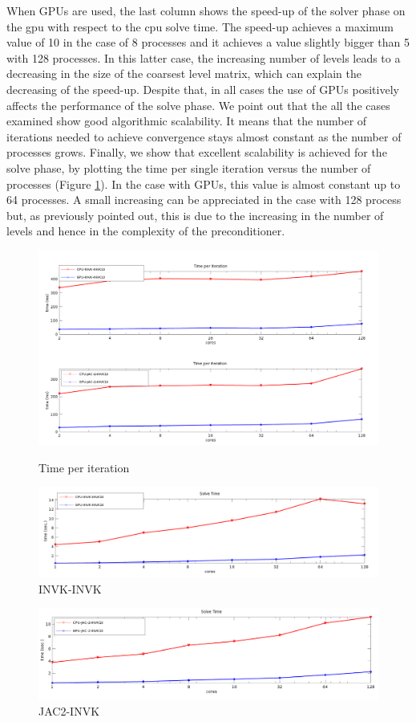 When GPUs are used, the last column shows the speed-up of the solver phase on the gpu with respect to the cpu solve time. The speed-up achieves a maximum value of 10 in the case of 8 processes and it achieves a value slightly bigger than 5 with 128 processes. In this latter case, the increasing number of levels leads to a decreasing in the size of the coarsest level matrix, which can explain the decreasing of the speed-up. Despite that, in all cases the use of GPUs positively affects the performance of the solve phase. 
We point out that the all the cases examined show good algorithmic scalability. It means that the number of iterations needed to achieve convergence stays almost constant as the number of processes grows. 
Finally, we show that excellent scalability is achieved for the solve phase, by plotting the time per single iteration versus the number of processes (Figure \ref{fig:time_per_it}). In the case with GPUs, this value is almost constant up to 64 processes. A small increasing can be appreciated in the case with 128 process but, as previously pointed out, this is due to the increasing in the number of levels and hence in the complexity of the preconditioner.     

\begin{figure}[h!]
\caption{Time per iteration}
\centering
\includegraphics[width=1\textwidth]{time_per_it.png}
\label{fig:time_per_it}
\end{figure}


\begin{figure}
\begin{center}
\includegraphics[width=.9\textwidth]{graf_invk.png}
\end{center}
\caption{INVK-INVK}
\end{figure}

\begin{figure}
\begin{center}
\includegraphics[width=.9\textwidth]{graf_jac2.png}
\end{center}
\caption{JAC2-INVK}
\end{figure}

